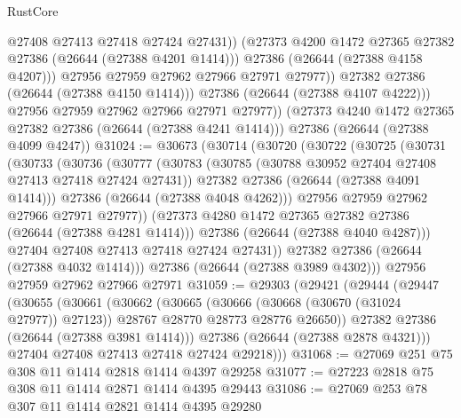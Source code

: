 \begin{lexlean}{RustCore}
\begin{coremodule}
                      @27408
                      @27413
                      @27418
                      @27424
                      @27431))
                  (@27373 @4200 @1472 @27365 @27382 @27386 (@26644 (@27388 @4201 @1414)))
                  @27386
                  (@26644 (@27388 @4158 @4207)))
                @27956
                @27959
                @27962
                @27966
                @27971
                @27977))
            @27382
            @27386
            (@26644 (@27388 @4150 @1414)))
          @27386
          (@26644 (@27388 @4107 @4222)))
        @27956
        @27959
        @27962
        @27966
        @27971
        @27977))
    (@27373 @4240 @1472 @27365 @27382 @27386 (@26644 (@27388 @4241 @1414)))
    @27386
    (@26644 (@27388 @4099 @4247))
@31024 := @30673
    (@30714
      (@30720
        (@30722
          (@30725
            (@30731
              (@30733
                (@30736
                  (@30777
                    (@30783
                      (@30785 (@30788 @30952 @27404 @27408 @27413 @27418 @27424 @27431))
                      @27382
                      @27386
                      (@26644 (@27388 @4091 @1414)))
                    @27386
                    (@26644 (@27388 @4048 @4262)))
                  @27956
                  @27959
                  @27962
                  @27966
                  @27971
                  @27977))
              (@27373 @4280 @1472 @27365 @27382 @27386 (@26644 (@27388 @4281 @1414)))
              @27386
              (@26644 (@27388 @4040 @4287)))
            @27404
            @27408
            @27413
            @27418
            @27424
            @27431))
        @27382
        @27386
        (@26644 (@27388 @4032 @1414)))
      @27386
      (@26644 (@27388 @3989 @4302)))
    @27956
    @27959
    @27962
    @27966
    @27971
@31059 := @29303
    (@29421
      (@29444
        (@29447
          (@30655
            (@30661
              (@30662
                (@30665
                  (@30666 (@30668 (@30670 (@31024 @27977)) @27123))
                  @28767
                  @28770
                  @28773
                  @28776
                  @26650))
              @27382
              @27386
              (@26644 (@27388 @3981 @1414)))
            @27386
            (@26644 (@27388 @2878 @4321)))
          @27404
          @27408
          @27413
          @27418
          @27424
          @29218)))
@31068 := @27069 @251 @75 @308 @11 @1414 @2818 @1414 @4397 @29258
@31077 := @27223 @2818 @75 @308 @11 @1414 @2871 @1414 @4395 @29443
@31086 := @27069 @253 @78 @307 @11 @1414 @2821 @1414 @4395 @29280

\end{coremodule}
\end{lexlean}
